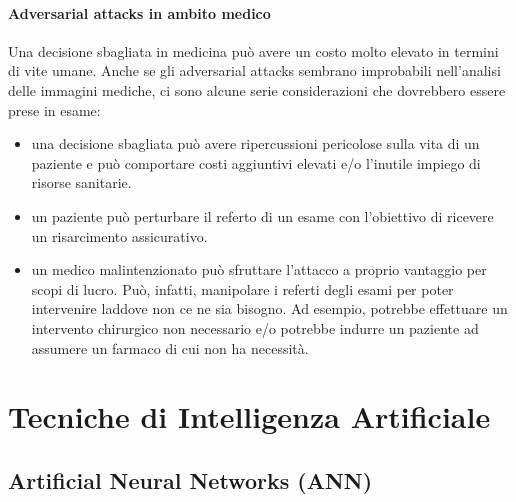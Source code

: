     \paragraph{Adversarial attacks in ambito medico}
    Una decisione sbagliata in medicina può avere un costo molto elevato in termini di vite umane.
    Anche se gli adversarial attacks sembrano improbabili nell'analisi delle immagini mediche, ci sono alcune serie considerazioni che dovrebbero essere prese in esame:
        \begin{itemize}
            \item una decisione sbagliata può avere ripercussioni pericolose sulla vita di un paziente e può comportare costi aggiuntivi elevati e/o l'inutile impiego di risorse sanitarie.
            \item un paziente può perturbare il referto di un esame con l'obiettivo di ricevere un risarcimento assicurativo.
            \item un medico malintenzionato può sfruttare l'attacco a proprio vantaggio per scopi di lucro. Può, infatti, manipolare i referti degli esami per poter intervenire laddove non ce ne sia bisogno. Ad esempio, potrebbe effettuare un intervento chirurgico non necessario e/o potrebbe indurre un paziente ad assumere un farmaco di cui non ha necessità.
        \end{itemize}
        
    
    \newpage
    
\section{Tecniche di Intelligenza Artificiale }
    
    \subsection{Artificial Neural Networks (ANN)}
        
